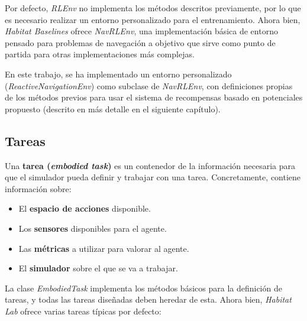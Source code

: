Por defecto, \textit{RLEnv} no implementa los métodos descritos previamente, por lo que es necesario realizar un entorno personalizado para el entrenamiento. Ahora bien, \textit{Habitat Baselines} ofrece \textit{NavRLEnv}, una implementación básica de entorno pensado para problemas de navegación a objetivo que sirve como punto de partida para otras implementaciones más complejas.

En este trabajo, se ha implementado un entorno personalizado (\textit{ReactiveNavigationEnv}) como subclase de \textit{NavRLEnv}, con definiciones propias de los métodos previos para usar el sistema de recompensas basado en potenciales propuesto (descrito en más detalle en el siguiente capítulo).

\subsection{Tareas}

Una \textbf{tarea (\textit{embodied task})} es un contenedor de la información necesaria para que el simulador pueda definir y trabajar con una tarea. Concretamente, contiene información sobre:

\begin{itemize}
	\item El \textbf{espacio de acciones} disponible.
	\item Los \textbf{sensores} disponibles para el agente.
	\item Las \textbf{métricas} a utilizar para valorar al agente.
	\item El \textbf{simulador} sobre el que se va a trabajar.
\end{itemize}

La clase \textit{EmbodiedTask} implementa los métodos básicos para la definición de tareas, y todas las tareas diseñadas deben heredar de esta. Ahora bien, \textit{Habitat Lab} ofrece varias tareas típicas por defecto:

